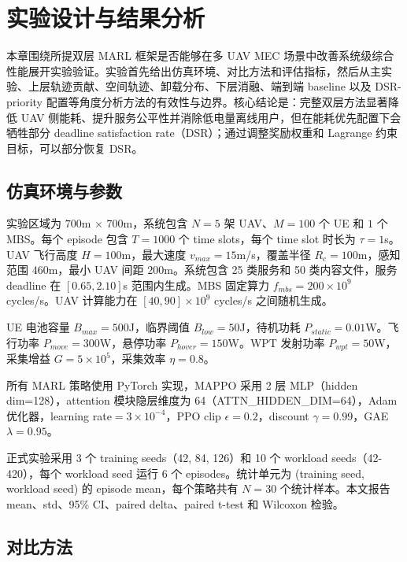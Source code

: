 \chapter{实验设计与结果分析}
\label{cha:experiments}

本章围绕所提双层 MARL 框架是否能够在多 UAV MEC 场景中改善系统级综合性能展开实验验证。实验首先给出仿真环境、对比方法和评估指标，然后从主实验、上层轨迹贡献、空间轨迹、卸载分布、下层消融、端到端 baseline 以及 DSR-priority 配置等角度分析方法的有效性与边界。核心结论是：完整双层方法显著降低 UAV 侧能耗、提升服务公平性并消除低电量离线用户，但在能耗优先配置下会牺牲部分 deadline satisfaction rate（DSR）；通过调整奖励权重和 Lagrange 约束目标，可以部分恢复 DSR。

\section{仿真环境与参数}
\label{sec:simulation-setup}

实验区域为 $700$m $\times$ 700m，系统包含 $N=5$ 架 UAV、$M=100$ 个 UE 和 $1$ 个 MBS。每个 episode 包含 $T=1000$ 个 time slots，每个 time slot 时长为 $\tau = 1$s。UAV 飞行高度 $H=100$m，最大速度 $v_{max}=15$m/s，覆盖半径 $R_c=100$m，感知范围 $460$m，最小 UAV 间距 $200$m。系统包含 25 类服务和 50 类内容文件，服务 deadline 在 $[0.65, 2.10]$s 范围内生成。MBS 固定算力 $f_{mbs} = 200 \times 10^9$ cycles/s。UAV 计算能力在 $[40, 90] \times 10^9$ cycles/s 之间随机生成。

UE 电池容量 $B_{max}=500$J，临界阈值 $B_{low}=50$J，待机功耗 $P_{static}=0.01$W。飞行功率 $P_{move}=300$W，悬停功率 $P_{hover}=150$W。WPT 发射功率 $P_{wpt}=50$W，采集增益 $G=5\times10^5$，采集效率 $\eta=0.8$。

所有 MARL 策略使用 PyTorch 实现，MAPPO 采用 2 层 MLP（hidden dim=128），attention 模块隐层维度为 64（ATTN\_HIDDEN\_DIM=64），Adam 优化器，learning rate$=3\times10^{-4}$，PPO clip $\epsilon=0.2$，discount $\gamma=0.99$，GAE $\lambda=0.95$。

正式实验采用 3 个 training seeds（42, 84, 126）和 10 个 workload seeds（42-420），每个 workload seed 运行 6 个 episodes。统计单元为 (training seed, workload seed) 的 episode mean，每个策略共有 $N=30$ 个统计样本。本文报告 mean、std、95\% CI、paired delta、paired t-test 和 Wilcoxon 检验。

\section{对比方法}
\label{sec:comparison-methods}

